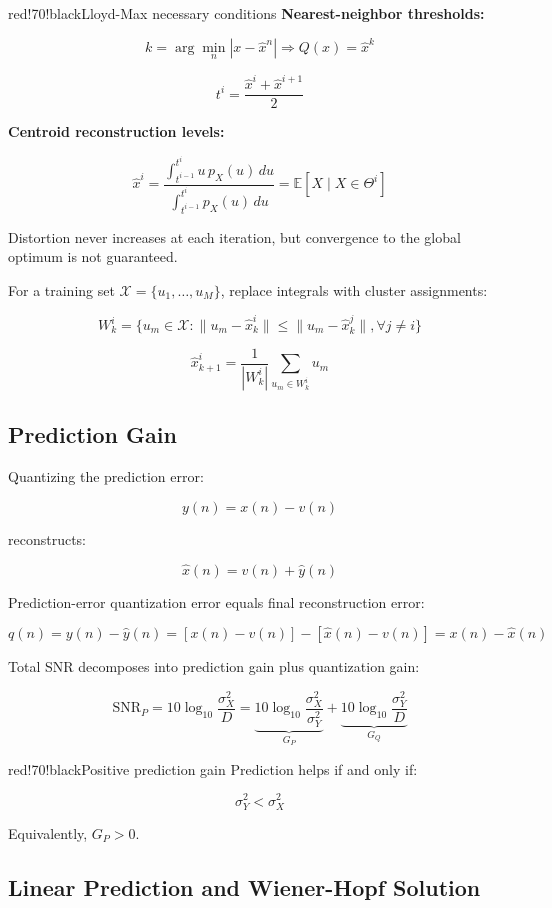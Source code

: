 \begin{calloutbox}{red!70!black}{Lloyd-Max necessary conditions}
\textbf{Nearest-neighbor thresholds:}

\[
k=\arg\min_n |x-\hat{x}^n| \Rightarrow Q(x)=\hat{x}^k
\]

\[
t^i=\frac{\hat{x}^i+\hat{x}^{i+1}}{2}
\]

\textbf{Centroid reconstruction levels:}

\[
\hat{x}^i=
\frac{\int_{t^{i-1}}^{t^i}u\,p_X(u)\,du}
{\int_{t^{i-1}}^{t^i}p_X(u)\,du}
=\mathbb{E}[X\mid X\in\Theta^i]
\]

Distortion never increases at each iteration, but convergence to the global optimum is not guaranteed.
\end{calloutbox}

For a training set $\mathcal{X}=\{u_1,\ldots,u_M\}$, replace integrals with cluster assignments:

\[
W_k^i=\{u_m\in\mathcal{X}: \|u_m-\hat{x}_k^i\|\leq\|u_m-\hat{x}_k^j\|,\forall j\neq i\}
\]

\[
\hat{x}_{k+1}^i=\frac{1}{|W_k^i|}\sum_{u_m\in W_k^i}u_m
\]

\subsection{Prediction Gain}

Quantizing the prediction error:

\[
y(n)=x(n)-v(n)
\]

reconstructs:

\[
\hat{x}(n)=v(n)+\hat{y}(n)
\]

Prediction-error quantization error equals final reconstruction error:

\[
q(n)=y(n)-\hat{y}(n)
=[x(n)-v(n)]-[\hat{x}(n)-v(n)]
=x(n)-\hat{x}(n)
\]

Total SNR decomposes into prediction gain plus quantization gain:

\[
\mathrm{SNR}_P
=10\log_{10}\frac{\sigma_X^2}{D}
=
\underbrace{10\log_{10}\frac{\sigma_X^2}{\sigma_Y^2}}_{G_P}
+
\underbrace{10\log_{10}\frac{\sigma_Y^2}{D}}_{G_Q}
\]

\begin{calloutbox}{red!70!black}{Positive prediction gain}
Prediction helps if and only if:

\[
\sigma_Y^2<\sigma_X^2
\]

Equivalently, $G_P>0$.
\end{calloutbox}

\subsection{Linear Prediction and Wiener-Hopf Solution}

